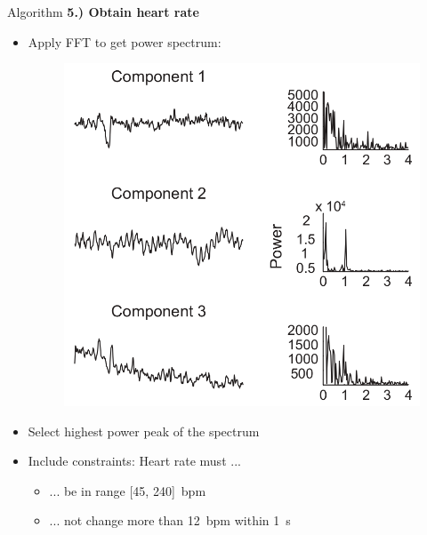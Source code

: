 \documentclass{beamer}
\begin{document}
\begin{frame}{Algorithm}
\textbf{\Large 5.) Obtain heart rate}
\begin{itemize}
	\item Apply FFT to get power spectrum:
		\begin{figure}
			\includegraphics[height=0.3\paperheight]{paper_power_spectrum.png}
		\end{figure} \pause
	\item Select highest power peak of the spectrum \pause
	\item Include constraints: Heart rate must ... \pause
		\begin{itemize}[label=-]
			\item ... be in range [45, 240]~bpm \pause
			\item ... not change more than 12~bpm within 1~s
		\end{itemize}
\end{itemize}
\end{frame}
\end{document}
